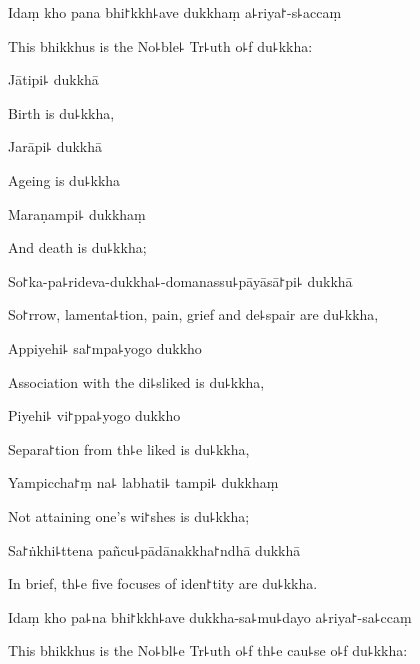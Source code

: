 Idaṃ kho pana bhi꜓kkh꜕ave dukkhaṃ a꜕riya꜓-s꜕accaṃ

\begin{english}
  This bhikkhus is the No꜕ble꜕ Tr꜕uth o꜕f du꜕kkha:
\end{english}

Jātipi꜕ dukkhā

\begin{english}
  Birth is du꜕kkha,
\end{english}

Jarāpi꜕ dukkhā

\begin{english}
  Ageing is du꜕kkha
\end{english}

Maraṇampi꜕ dukkhaṃ

\begin{english}
  And death is du꜕kkha;
\end{english}

So꜓ka-pa꜕rideva-dukkha꜕-domanassu꜕pāyāsā꜓pi꜕ dukkhā

\begin{english}
  So꜓rrow, lamenta꜕tion, pain, grief and de꜕spair are du꜕kkha,
\end{english}

Appiyehi꜕ sa꜓mpa꜕yogo dukkho

\begin{english}
  Association with the di꜕sliked is du꜕kkha,
\end{english}

Piyehi꜕ vi꜓ppa꜕yogo dukkho

\begin{english}
  Separa꜓tion from th꜕e liked is du꜕kkha,
\end{english}

Yampiccha꜓ṃ na꜕ labhati꜕ tampi꜕ dukkhaṃ

\begin{english}
  Not attaining one's wi꜓shes is du꜕kkha;
\end{english}

Sa꜓ṅkhi꜕ttena pañcu꜕pādānakkha꜓ndhā dukkhā

\begin{english}
  In brief, th꜕e five focuses of iden꜓tity are du꜕kkha.
\end{english}

Idaṃ kho pa꜕na bhi꜓kkh꜕ave dukkha-sa꜕mu꜕dayo a꜕riya꜓-sa꜕ccaṃ

\begin{english}
  This bhikkhus is the No꜕bl꜕e Tr꜕uth o꜕f th꜕e cau꜕se o꜕f du꜕kkha:
\end{english}

